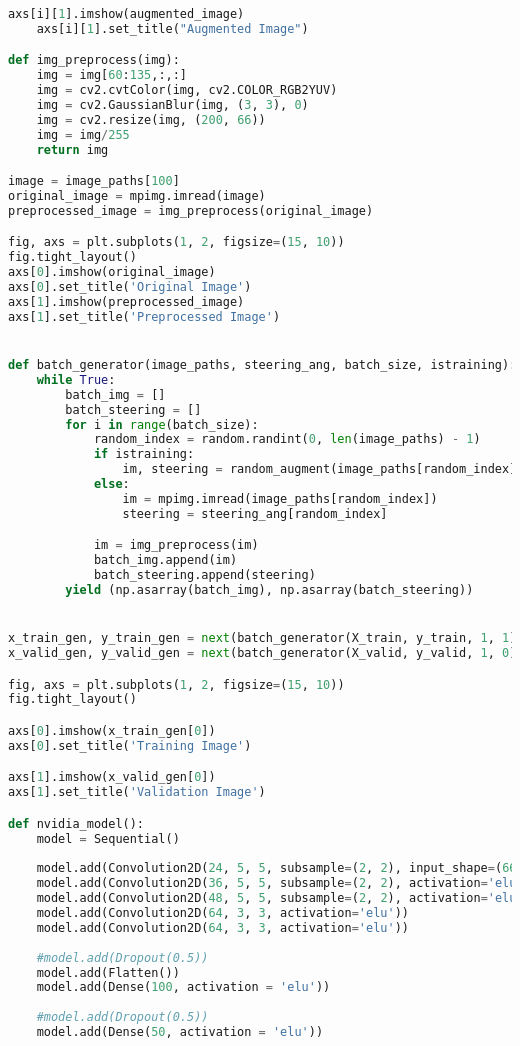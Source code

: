 \begin{lstlisting}[language=Python]
	axs[i][1].imshow(augmented_image)
	axs[i][1].set_title("Augmented Image")

def img_preprocess(img):
	img = img[60:135,:,:]
	img = cv2.cvtColor(img, cv2.COLOR_RGB2YUV)
	img = cv2.GaussianBlur(img, (3, 3), 0)
	img = cv2.resize(img, (200, 66))
	img = img/255
	return img

image = image_paths[100]
original_image = mpimg.imread(image)
preprocessed_image = img_preprocess(original_image)

fig, axs = plt.subplots(1, 2, figsize=(15, 10))
fig.tight_layout()
axs[0].imshow(original_image)
axs[0].set_title('Original Image')
axs[1].imshow(preprocessed_image)
axs[1].set_title('Preprocessed Image')


def batch_generator(image_paths, steering_ang, batch_size, istraining):
	while True:
		batch_img = []
		batch_steering = []
		for i in range(batch_size):
			random_index = random.randint(0, len(image_paths) - 1)
			if istraining:
				im, steering = random_augment(image_paths[random_index], steering_ang[random_index])
			else:
				im = mpimg.imread(image_paths[random_index])
				steering = steering_ang[random_index]

			im = img_preprocess(im)
			batch_img.append(im)
			batch_steering.append(steering)
		yield (np.asarray(batch_img), np.asarray(batch_steering))


x_train_gen, y_train_gen = next(batch_generator(X_train, y_train, 1, 1))
x_valid_gen, y_valid_gen = next(batch_generator(X_valid, y_valid, 1, 0))

fig, axs = plt.subplots(1, 2, figsize=(15, 10))
fig.tight_layout()

axs[0].imshow(x_train_gen[0])
axs[0].set_title('Training Image')

axs[1].imshow(x_valid_gen[0])
axs[1].set_title('Validation Image')

def nvidia_model():
	model = Sequential()
	
	model.add(Convolution2D(24, 5, 5, subsample=(2, 2), input_shape=(66, 200, 3), activation='elu'))
	model.add(Convolution2D(36, 5, 5, subsample=(2, 2), activation='elu'))
	model.add(Convolution2D(48, 5, 5, subsample=(2, 2), activation='elu'))
	model.add(Convolution2D(64, 3, 3, activation='elu'))
	model.add(Convolution2D(64, 3, 3, activation='elu'))
	
	#model.add(Dropout(0.5))
	model.add(Flatten())
	model.add(Dense(100, activation = 'elu'))
	
	#model.add(Dropout(0.5))
	model.add(Dense(50, activation = 'elu'))
	

\end{lstlisting}
